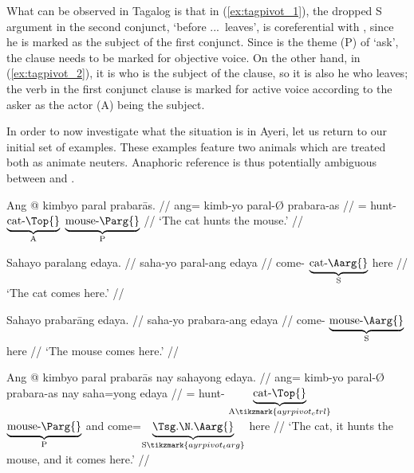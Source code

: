 What can be observed in Tagalog is that in (\ref{ex:tagpivot_1}), the dropped S
argument in the second conjunct,  `before ...\ leaves', is
coreferential with , since he is marked as the subject of the first
conjunct. Since  is the theme (P) of  `ask', the clause
needs to be marked for objective voice. On the other hand, in
(\ref{ex:tagpivot_2}), it is  who is the subject of the clause, so it
is also he who leaves; the verb in the first conjunct clause is marked for
active voice according to the asker as the actor (A) being the subject.

In order to now investigate what the situation is in Ayeri, let us return to
our initial set of examples. These examples feature two animals which are
treated both as animate neuters. Anaphoric reference is thus potentially
ambiguous between  and .

\pex\label{ex:ayrpivot}%
\a\label{ex:ayrpivot_1}
	\begingl
		\gla Ang @ kimbyo paral prabarās. //
		\glb ang= kimb-yo paral-Ø prabara-as //
		\glc \AgtT{}= hunt-\TsgN{}
			$\underbrace{\text{cat-\Top{}}}_{\text{A}}$
			$\underbrace{\text{mouse-\Parg{}}}_{\text{P}}$ //
		\glft `The cat hunts the mouse.' //
	\endgl
	
\a\label{ex:ayrpivot_2}%
	\begingl
		\gla Sahayo paralang edaya. //
		\glb saha-yo paral-ang edaya //
		\glc come-\TsgN{} $\underbrace{\text{cat-\Aarg{}}}_{\text{S}}$
			here //
		\glft `The cat comes here.' //
	\endgl
	
\a\label{ex:ayrpivot_3}%
	\begingl
		\gla Sahayo prabarāng edaya. //
		\glb saha-yo prabara-ang edaya //
		\glc come-\TsgN{} $\underbrace{\text{mouse-\Aarg{}}}_{\text{S}}$
			here //
		\glft `The mouse comes here.' //
	\endgl
	
\a\label{ex:ayrpivot_4}%
	\begingl[aboveglftskip=1em]
		\gla Ang @ kimbyo paral prabarās nay sahayong edaya. //
		\glb ang= kimb-yo paral-Ø prabara-as nay saha=yong edaya  //
		\glc \AgtT{}= hunt-\TsgN{}
			$\underbrace{\text{cat-\Top{}}}_{\text{A}\tikzmark{ayrpivot_ctrl}}$
			$\underbrace{\text{mouse-\Parg{}}}_{\text{P}}$
			and
			come=$\underbrace{\text{\smash{\TsgN{}}.\Aarg{}}}_%
				{\text{S}\tikzmark{ayrpivot_targ}}$
			here //
		\glft `The cat, it hunts the mouse, and it comes here.' //
	\endgl

\xe

